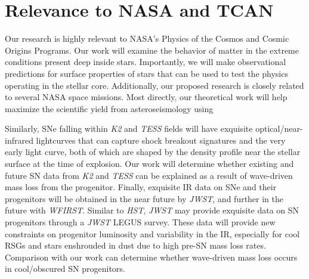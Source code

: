 {\color{orange}

\section{Relevance to NASA and TCAN}



Our research is highly relevant to NASA's Physics of the Cosmos and Cosmic Origins Programs. Our work will examine the behavior of matter in the extreme conditions present deep inside stars. Importantly, we will make observational predictions for surface properties of stars that can be used to test the physics operating in the stellar core. Additionally, our proposed research is closely related to several NASA space missions. Most directly, our theoretical work will help maximize the scientific yield from asteroseismology using

Similarly, SNe falling within {\it K2} and {\it TESS} fields will have exquisite optical/near-infrared lightcurves that can capture shock breakout signatures and the very early light curve, both of which are shaped by the density profile near the stellar surface at the time of explosion. Our work will determine whether existing and future SN data from {\it K2} and {\it TESS} can be explained as a result of wave-driven mass loss from the progenitor. Finally, exquisite IR data on SNe and their progenitors will be obtained in the near future by {\it JWST}, and further in the future with {\it WFIRST}. Similar to {\it HST}, {\it JWST} may provide exquisite data on SN progenitors through a {\it JWST} LEGUS survey. These data will provide new constraints on progenitor luminosity and variability in the IR, especially for cool RSGs and stars enshrouded in dust due to high pre-SN mass loss rates. Comparison with our work can determine whether wave-driven mass loss occurs in cool/obscured SN progenitors.


}